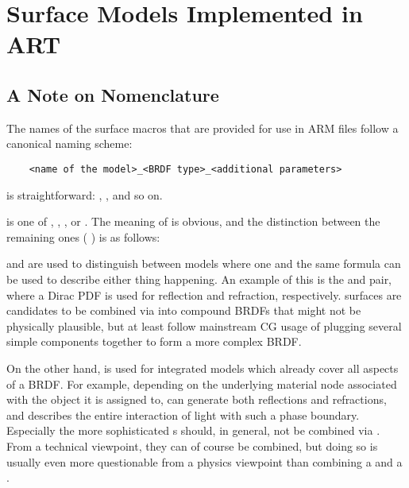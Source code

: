 \section{Surface Models Implemented in ART}

\subsection{A Note on Nomenclature}
 
    The names of the surface macros that are provided for use in ARM files follow
    a canonical naming scheme:
    
\begin{verbatim}
    <name of the model>_<BRDF type>_<additional parameters>
\end{verbatim}

     is straightforward: , , and so on.
    
     is one of , , , or . The
    meaning of  is obvious, and the distinction between the remaining 
    ones ( \vs {}) is as follows:
    
     and  are used to distinguish between models where one
    and the same formula can be used to describe either thing happening. An example of this is
    the  and  pair, where a Dirac PDF is used
    for reflection and refraction, respectively.  surfaces
    are candidates to be combined via  into compound BRDFs that
    might not be physically plausible, but at least follow mainstream CG usage of plugging several 
    simple components together to form a more complex BRDF.
    
    On the other hand,  is used for integrated models which already cover
    all aspects of a BRDF. For example, depending on the underlying material 
    node associated with the object it is assigned to,  
    can generate both reflections and refractions, and describes the entire interaction of light with such a phase boundary. Especially the more sophisticated s should, in general, 
    not be combined via . From a technical viewpoint, they can of course be combined, but doing so is usually even more questionable from a physics viewpoint than combining a  and a .
    
